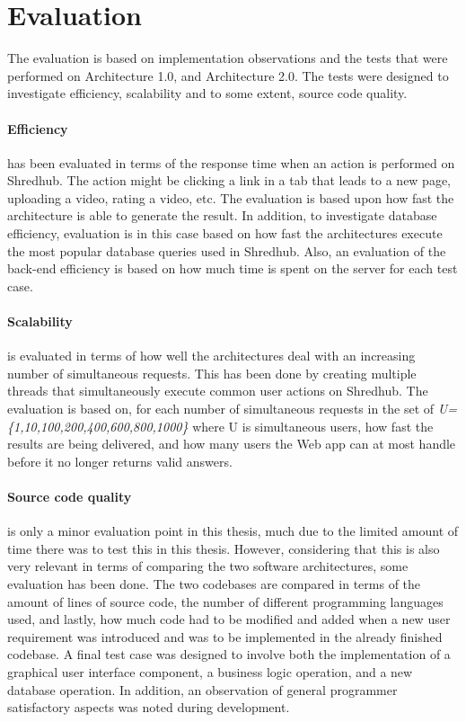 \section{Evaluation}
The evaluation is based on implementation observations and the tests that were performed on Architecture 1.0, and Architecture 2.0. The tests were designed to investigate efficiency, scalability and to some extent, source code quality. 
\paragraph{Efficiency} has been evaluated in terms of the response time when an action is performed on Shredhub. The action might be clicking a link in a tab that leads to a new page, uploading a video, rating a video, etc. The evaluation is based upon how fast the architecture is able to generate the result. In addition, to investigate database efficiency, evaluation is in this case based on how fast the architectures execute the most popular database queries used in Shredhub. Also, an evaluation of the back-end efficiency is based on how much time is spent on the server for each test case. 

\paragraph{Scalability} is evaluated in terms of how well the architectures deal with an increasing number of simultaneous requests. This has been done by creating multiple threads that simultaneously execute common user actions on Shredhub. The evaluation is based on, for each number of simultaneous requests in the set of \textit{U=\{1,10,100,200,400,600,800,1000\}} where U is simultaneous users, how fast the results are being delivered, and how many users the Web app can at most handle before it no longer returns valid answers. 

\paragraph{Source code quality} is only a minor evaluation point in this thesis, much due to the limited amount of time there was to test this in this thesis. However, considering that this is also very relevant in terms of comparing the two software architectures, some evaluation has been done. The two codebases are compared in terms of the amount of lines of source code, the number of different programming languages used, and lastly, how much code had to be modified and added when a new user requirement was introduced and was to be implemented in the already finished codebase. A final test case was designed to involve both the implementation of a graphical user interface component, a business logic operation, and a new database operation. In addition, an observation of general programmer satisfactory aspects was noted during development. 																											
